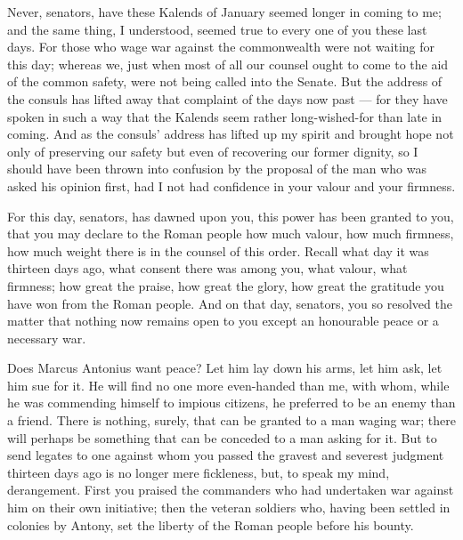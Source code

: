 
 Never, senators, have these Kalends of January seemed longer in coming to me; and the same thing, I understood, seemed true to every one of you these last days. For those who wage war against the commonwealth were not waiting for this day; whereas we, just when most of all our counsel ought to come to the aid of the common safety, were not being called into the Senate. But the address of the consuls has lifted away that complaint of the days now past --- for they have spoken in such a way that the Kalends seem rather long-wished-for than late in coming. And as the consuls' address has lifted up my spirit and brought hope not only of preserving our safety but even of recovering our former dignity, so I should have been thrown into confusion by the proposal of the man who was asked his opinion first, had I not had confidence in your valour and your firmness.

 For this day, senators, has dawned upon you, this power has been granted to you, that you may declare to the Roman people how much valour, how much firmness, how much weight there is in the counsel of this order. Recall what day it was thirteen days ago, what consent there was among you, what valour, what firmness; how great the praise, how great the glory, how great the gratitude you have won from the Roman people. And on that day, senators, you so resolved the matter that nothing now remains open to you except an honourable peace or a necessary war.

 Does Marcus Antonius want peace? Let him lay down his arms, let him ask, let him sue for it. He will find no one more even-handed than me, with whom, while he was commending himself to impious citizens, he preferred to be an enemy than a friend. There is nothing, surely, that can be granted to a man waging war; there will perhaps be something that can be conceded to a man asking for it. But to send legates to one against whom you passed the gravest and severest judgment thirteen days ago is no longer mere fickleness, but, to speak my mind, derangement. First you praised the commanders who had undertaken war against him on their own initiative; then the veteran soldiers who, having been settled in colonies by Antony, set the liberty of the Roman people before his bounty.

